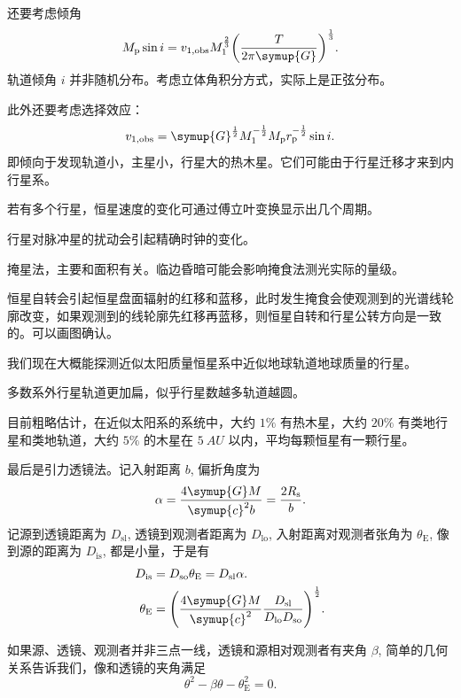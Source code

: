\documentclass[../天体物理基础.tex]{subfiles}
\begin{document}
还要考虑倾角
\begin{equation}
M_{\mathrm{p}}\sin{i}=v_{1,\mathrm{obs}}M_{1}^{\frac{2}{3}}\mleft(\frac{T}{2\pi\symup{G}}\mright)^{\frac{1}{3}}.
\end{equation}
轨道倾角 $i$ 并非随机分布。考虑立体角积分方式，实际上是正弦分布。

此外还要考虑选择效应：
\begin{equation}
v_{1,\mathrm{obs}}=\symup{G}^{\frac{1}{2}}M_{1}^{-\frac{1}{2}}M_{\mathrm{p}}r_{\mathrm{p}}^{-\frac{1}{2}}\sin{i}.
\end{equation}
即倾向于发现轨道小，主星小，行星大的热木星。它们可能由于行星迁移才来到内行星系。

若有多个行星，恒星速度的变化可通过傅立叶变换显示出几个周期。

行星对脉冲星的扰动会引起精确时钟的变化。

掩星法，主要和面积有关。临边昏暗可能会影响掩食法测光实际的量级。

恒星自转会引起恒星盘面辐射的红移和蓝移，此时发生掩食会使观测到的光谱线轮廓改变，如果观测到的线轮廓先红移再蓝移，则恒星自转和行星公转方向是一致的。可以画图确认。

我们现在大概能探测近似太阳质量恒星系中近似地球轨道地球质量的行星。

多数系外行星轨道更加扁，似乎行星数越多轨道越圆。

目前粗略估计，在近似太阳系的系统中，大约 $1\%$ 有热木星，大约 $20\%$ 有类地行星和类地轨道，大约 $5\%$ 的木星在 $\qty{5}{AU}$ 以内，平均每颗恒星有一颗行星。

最后是引力透镜法。记入射距离 $b$, 偏折角度为
\begin{equation}
\alpha=\frac{4\symup{G}M}{\symup{c}^{2}b}=\frac{2R_{\mathrm{s}}}{b}.
\end{equation}
记源到透镜距离为 $D_{\mathrm{sl}}$, 透镜到观测者距离为 $D_{\mathrm{lo}}$, 入射距离对观测者张角为 $\theta_{\mathrm{E}}$, 像到源的距离为 $D_{\mathrm{is}}$, 都是小量，于是有
\begin{align}
D_{\mathrm{is}}&=D_{\mathrm{so}}\theta_{\mathrm{E}}=D_{\mathrm{sl}}\alpha.\\
\theta_{\mathrm{E}}&=\mleft(\frac{4\symup{G}M}{\symup{c}^{2}}\frac{D_{\mathrm{sl}}}{D_{\mathrm{lo}}D_{\mathrm{so}}}\mright)^{\frac{1}{2}}.
\end{align}

如果源、透镜、观测者并非三点一线，透镜和源相对观测者有夹角 $\beta$, 简单的几何关系告诉我们，像和透镜的夹角满足
\begin{equation}
\theta^{2}-\beta\theta-\theta_{\mathrm{E}}^{2}=0.
\end{equation}
\end{document}
